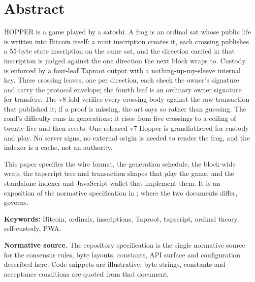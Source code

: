 \thispagestyle{plain}
\section*{Abstract}

\begin{notebox}
\noindent
HOPPER is a game played by a satoshi. A frog is an ordinal sat whose public
life is written into Bitcoin itself: a mint inscription creates it, each
crossing publishes a 55-byte state inscription on the same sat, and the
direction carried in that inscription is judged against the one direction
the next block wraps to. Custody is enforced by a four-leaf Taproot output
with a nothing-up-my-sleeve internal key. Three crossing leaves, one per
direction, each check the owner's signature and carry the protocol envelope;
the fourth leaf is an ordinary owner signature for transfers. The v8 fold
verifies every crossing body against the raw transaction that published it;
if a proof is missing, the art says so rather than guessing. The road's
difficulty runs in generations: it rises from five crossings to a ceiling of
twenty-five and then resets. One released v7 Hopper is grandfathered for
custody and play. No server signs, no external origin is needed to render the
frog, and the indexer is a cache, not an authority.

This paper specifies the wire format, the generation schedule, the
block-wide wrap, the tapscript tree and transaction shapes that play the
game, and the standalone indexer and JavaScript wallet that implement them.
It is an exposition of the normative specification in ; where
the two documents differ,  governs.
\end{notebox}

\vspace{4mm}
\noindent\textbf{\sffamily Keywords:} Bitcoin, ordinals, inscriptions,
Taproot, tapscript, ordinal theory, self-custody, PWA.

\vspace{2mm}
\noindent\textbf{\sffamily Normative source.} The repository specification
 is the single normative source for the
consensus rules, byte layouts, constants, API surface and configuration
described here. Code snippets are illustrative; byte strings, constants and
acceptance conditions are quoted from that document.


